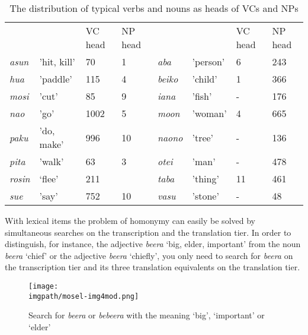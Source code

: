 \begin{table}

\begin{tabular}{llllllll}

 &
 &
 VC head  &
 NP head  &
 &
 &
 VC head  &
 NP head \\
 \textit{asun}  &
 'hit, kill'  &
 70  &
 1  &
 \textit{aba}  &
 'person' &
 6 &
 243\\
 \textit{hua}  &
 'paddle'  &
 115  &
 4  &
 \textit{beiko}  &
 'child'  &
 1  &
 366 \\
 \textit{mosi}  &
 'cut'  &
 85 &
 9  &
 \textit{iana}  &
 'fish'  &
 {}-  &
 176 \\
 \textit{nao}  &
 'go'  &
 1002  &
 5  &
 \textit{moon}  &
 'woman'  &
 4  &
 665 \\
\itshape paku &
 'do, make' &
 996 &
 10 &
 \textit{naono}  &
 'tree'  &
 {}-  &
 136 \\
 \textit{pita}  &
 'walk'  &
 63 &
 3  &
 \textit{otei}  &
 'man'  &
 {}-  &
 478 \\
\itshape rosin &
 `flee' &
 211 &
 &
 \textit{taba}  &
 'thing'  &
 11  &
 461 \\
 \textit{sue}  &
 'say'  &
 752  &
 10  &
 \textit{vasu}  &
 'stone'  &
 {}- &
 48 \\
\end{tabular}
\caption{The distribution of typical verbs and nouns as heads of VCs and NPs}
\label{tab:m10-2}
\end{table}



With lexical items the problem of homonymy can easily be solved by simultaneous searches on the transcription and the translation tier. In order to distinguish, for instance, the adjective \textit{beera} `big, elder, important' from the noun \textit{beera} `chief' or the adjective \textit{beera} `chiefly', you only need to search for \textit{beera} on the transcription tier and its three translation equivalents on the translation tier.

\begin{figure}
\begin{center}
 
\texttt{[image: \\imgpath/mosel-img4mod.png]}
\caption{Search for \textit{beera }or \textit{bebeera }with the meaning `big', `important' or `elder'}
\end{center}

\label{fig:m10-2}
\end{figure}


